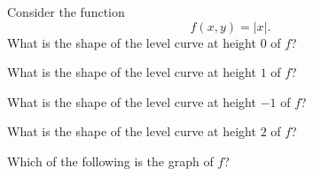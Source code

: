 \documentclass{ximera}
\begin{document}
\begin{problem}
Consider the function
\[
f(x,y) = |x|.
\]
What is the shape of the level curve at height $0$ of $f$?
\begin{multipleChoice}
\end{multipleChoice}

What is the shape of the level curve at height $1$ of $f$?
\begin{multipleChoice}
\end{multipleChoice}

What is the shape of the level curve at height $-1$ of $f$?
\begin{multipleChoice}
\end{multipleChoice}

What is the shape of the level curve at height $2$ of $f$?
\begin{multipleChoice}
\end{multipleChoice}

Which of the following is the graph of $f$?


\end{problem}
\end{document}
